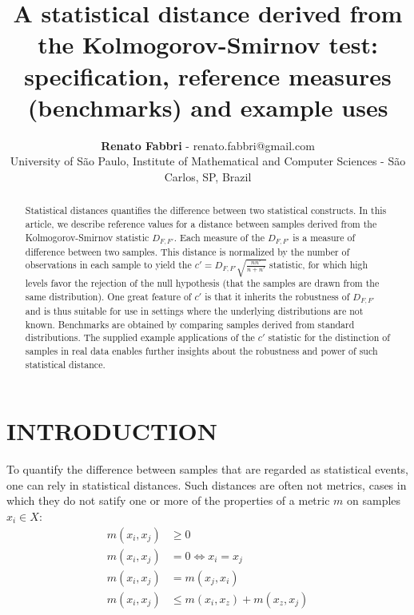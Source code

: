 \documentclass[12pt,fleqn]{article}
\title{A statistical distance derived from the Kolmogorov-Smirnov test:
	specification, reference measures (benchmarks) and example uses}
\author
    {\rm \begin{tabular}{l} 
    \textbf{Renato Fabbri}$$ - {\textnormal renato.fabbri@gmail.com}\\%
    {\fontsize{11}{0}\selectfont University of São Paulo, Institute of Mathematical and Computer Sciences - São Carlos, SP, Brazil}\vspace*{-0.05cm} \\
  \end{tabular}}
\renewcommand{\headrulewidth}{0.0pt}
\begin{document}
\maketitle

\thispagestyle{firspagetstyle}

\renewcommand{\headrulewidth}{0.0pt}
\rhead{}

\begin{abstract}
Statistical distances quantifies the difference between two statistical constructs.
In this article, we describe reference values for a distance between samples
derived from the Kolmogorov-Smirnov statistic $D_{F,F'}$.
Each measure of the $D_{F,F'}$ is a measure of difference between two samples.
This distance is normalized by the number of observations in each sample
to yield the $c'=D_{F,F'}\sqrt{\frac{n n'}{n+n'}}$ statistic,
for which high levels favor the rejection of the
	null hypothesis (that the samples are drawn from the same distribution).
One great feature of $c'$ is that it inherits the robustness of
	$D_{F,F'}$ and is thus suitable for use in settings where
	the underlying distributions are not known.
Benchmarks are obtained by comparing samples derived from standard distributions.
The supplied example applications of the $c'$ statistic for the distinction
	of samples in real data enables further
insights about the robustness and power of such statistical distance.
\end{abstract}


\pagestyle{fancy}

\section{INTRODUCTION}\label{sec:intro}
To quantify the difference between samples that are regarded as statistical events,
one can rely in statistical distances.
Such distances are often not metrics, cases in which they do not satify one or more of
the properties of a metric $m$ on samples $x_i \in X$:
\begin{align}
	m(x_i,x_j) &  \geq 0 \\
	m(x_i,x_j) &  = 0 \Leftrightarrow x_i = x_j \\
	m(x_i,x_j) &  = m(x_j,x_i)\\
	m(x_i,x_j) &  \leq m(x_i,x_z) + m(x_z,x_j)
\end{align}
\end{document}
